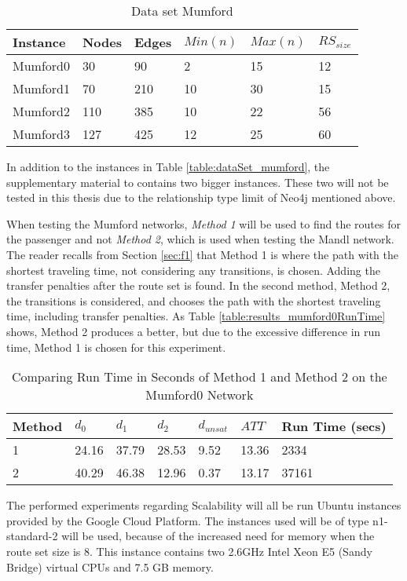 \begin{table}[H]
	\centering
	\begin{tabular}{|l|l|l|l|l|l|}
    	\hline
    	Instance & Nodes&Edges & $Min(n)$ & $Max(n)$ & $RS_{size}$\\
    	\hline
   	    Mumford0 & 30&90 & 2&15 & 12 \\
   	    Mumford1 & 70&210 & 10&30 & 15 \\
   	    Mumford2 & 110&385 & 10&22 & 56 \\
   	    Mumford3 & 127&425 & 12&25 & 60 \\
   	    \hline
    \end{tabular}
    \caption{Data set Mumford}
    \label{table:dataSet_mumford}
\end{table}

In addition to the instances in Table \vref{table:dataSet_mumford}, the supplementary material to \citet{mumford13} contains two bigger instances. These two will not be tested in this thesis due to the relationship type limit of Neo4j mentioned above. 

When testing the Mumford networks, \textit{Method 1} will be used to find the routes for the passenger and not \textit{Method 2}, which is used when testing the Mandl network. The reader recalls from Section \vref{sec:f1} that Method 1 is where the path with the shortest traveling time, not considering any transitions, is chosen. Adding the transfer penalties after the route set is found. In the second method, Method 2, the transitions is considered, and chooses the path with the shortest traveling time, including transfer penalties. As Table \vref{table:results_mumford0RunTime} shows, Method 2 produces a better, but due to the excessive difference in run time, Method 1 is chosen for this experiment. 

\begin{table}[H]
    \centering
    \begin{tabular}{|l|l|l|l|l|l|l|}
        \hline
        Method & $d_0$ & $d_1$ & $d_2$ & $d_{unsat}$ & $ATT$ & Run Time (secs) \\
        \hline
        1 & 24.16 & 37.79 & 28.53 & 9.52 & 13.36 & 2334 \\
        2 & 40.29 & 46.38 & 12.96 & 0.37 & 13.17 & 37161 \\
        \hline
    \end{tabular}
    \caption{Comparing Run Time in Seconds of Method 1 and Method 2 on the Mumford0 Network}
    \label{table:results_mumford0RunTime}
\end{table}

The performed experiments regarding Scalability will all be run Ubuntu instances provided by the Google Cloud Platform. The instances used will be of type n1-standard-2 will be used, because of the increased need for memory when the route set size is 8. This instance contains two 2.6GHz Intel Xeon E5 (Sandy Bridge) virtual CPUs and 7.5 GB memory\cite{website:google}.

